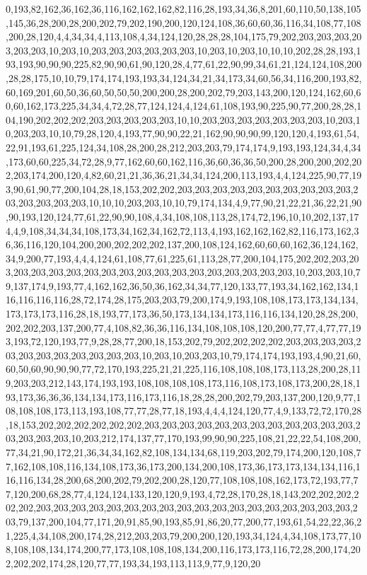 0,193,82,162,36,162,36,116,162,162,162,82,116,28,193,34,36,8,201,60,110,50,138,105,145,36,28,200,28,200,202,79,202,190,200,120,124,108,36,60,60,36,116,34,108,77,108,200,28,120,4,4,34,34,4,113,108,4,34,124,120,28,28,28,104,175,79,202,203,203,203,203,203,203,10,203,10,203,203,203,203,203,203,10,203,10,203,10,10,10,202,28,28,193,193,193,90,90,90,225,82,90,90,61,90,120,28,4,77,61,22,90,99,34,61,21,124,124,108,200,28,28,175,10,10,79,174,174,193,193,34,124,34,21,34,173,34,60,56,34,116,200,193,82,60,169,201,60,50,36,60,50,50,50,200,200,28,200,202,79,203,143,200,120,124,162,60,60,60,162,173,225,34,34,4,72,28,77,124,124,4,124,61,108,193,90,225,90,77,200,28,28,104,190,202,202,202,203,203,203,203,203,10,10,203,203,203,203,203,203,203,10,203,10,203,203,10,10,79,28,120,4,193,77,90,90,22,21,162,90,90,90,99,120,120,4,193,61,54,22,91,193,61,225,124,34,108,28,200,28,212,203,203,79,174,174,9,193,193,124,34,4,34,173,60,60,225,34,72,28,9,77,162,60,60,162,116,36,60,36,36,50,200,28,200,200,202,202,203,174,200,120,4,82,60,21,21,36,36,21,34,34,124,200,113,193,4,4,124,225,90,77,193,90,61,90,77,200,104,28,18,153,202,202,203,203,203,203,203,203,203,203,203,203,203,203,203,203,203,10,10,10,203,203,10,10,79,174,134,4,9,77,90,21,22,21,36,22,21,90,90,193,120,124,77,61,22,90,90,108,4,34,108,108,113,28,174,72,196,10,10,202,137,174,4,9,108,34,34,34,108,173,34,162,34,162,72,113,4,193,162,162,162,82,116,173,162,36,36,116,120,104,200,200,202,202,202,137,200,108,124,162,60,60,60,162,36,124,162,34,9,200,77,193,4,4,4,124,61,108,77,61,225,61,113,28,77,200,104,175,202,202,203,203,203,203,203,203,203,203,203,203,203,203,203,203,203,203,203,203,10,203,203,10,79,137,174,9,193,77,4,162,162,36,50,36,162,34,34,77,120,133,77,193,34,162,162,134,116,116,116,116,28,72,174,28,175,203,203,79,200,174,9,193,108,108,173,173,134,134,173,173,173,116,28,18,193,77,173,36,50,173,134,134,173,116,116,134,120,28,28,200,202,202,203,137,200,77,4,108,82,36,36,116,134,108,108,108,120,200,77,77,4,77,77,193,193,72,120,193,77,9,28,28,77,200,18,153,202,79,202,202,202,202,203,203,203,203,203,203,203,203,203,203,203,203,10,203,10,203,203,10,79,174,174,193,193,4,90,21,60,60,50,60,90,90,90,77,72,170,193,225,21,21,225,116,108,108,108,173,113,28,200,28,119,203,203,212,143,174,193,193,108,108,108,108,173,116,108,173,108,173,200,28,18,193,173,36,36,36,134,134,173,116,173,116,18,28,28,200,202,79,203,137,200,120,9,77,108,108,108,173,113,193,108,77,77,28,77,18,193,4,4,4,124,120,77,4,9,133,72,72,170,28,18,153,202,202,202,202,202,202,203,203,203,203,203,203,203,203,203,203,203,203,203,203,203,203,10,203,212,174,137,77,170,193,99,90,90,225,108,21,22,22,54,108,200,77,34,21,90,172,21,36,34,34,162,82,108,134,134,68,119,203,202,79,174,200,120,108,77,162,108,108,116,134,108,173,36,173,200,134,200,108,173,36,173,173,134,134,116,116,116,134,28,200,68,200,202,79,202,200,28,120,77,108,108,108,162,173,72,193,77,77,120,200,68,28,77,4,124,124,133,120,120,9,193,4,72,28,170,28,18,143,202,202,202,202,202,203,203,203,203,203,203,203,203,203,203,203,203,203,203,203,203,203,203,203,79,137,200,104,77,171,20,91,85,90,193,85,91,86,20,77,200,77,193,61,54,22,22,36,21,225,4,34,108,200,174,28,212,203,203,79,200,200,120,193,34,124,4,34,108,173,77,108,108,108,134,174,200,77,173,108,108,108,134,200,116,173,173,116,72,28,200,174,202,202,202,174,28,120,77,77,193,34,193,113,113,9,77,9,120,20